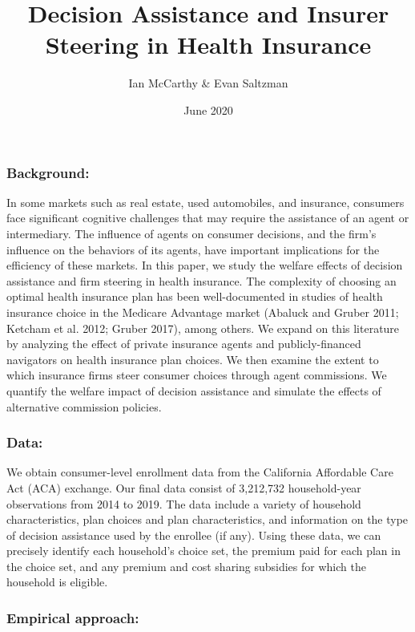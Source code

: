 \documentclass[
  11pt,
]{article}
\title{Decision Assistance and Insurer Steering in Health Insurance}
\author{Ian McCarthy \& Evan Saltzman}
\date{June 2020}
\begin{document}
\maketitle

\hypertarget{background}{%
\subsubsection{Background:}\label{background}}

In some markets such as real estate, used automobiles, and insurance, consumers face significant cognitive challenges that may require the assistance of an agent or intermediary. The influence of agents on consumer decisions, and the firm's influence on the behaviors of its agents, have important implications for the efficiency of these markets. In this paper, we study the welfare effects of decision assistance and firm steering in health insurance. The complexity of choosing an optimal health insurance plan has been well-documented in studies of health insurance choice in the Medicare Advantage market (Abaluck and Gruber 2011; Ketcham et al. 2012; Gruber 2017), among others. We expand on this literature by analyzing the effect of private insurance agents and publicly-financed navigators on health insurance plan choices. We then examine the extent to which insurance firms steer consumer choices through agent commissions. We quantify the welfare impact of decision assistance and simulate the effects of alternative commission policies.

\hypertarget{data}{%
\subsubsection{Data:}\label{data}}

We obtain consumer-level enrollment data from the California Affordable Care Act (ACA) exchange. Our final data consist of 3,212,732 household-year observations from 2014 to 2019. The data include a variety of household characteristics, plan choices and plan characteristics, and information on the type of decision assistance used by the enrollee (if any). Using these data, we can precisely identify each household's choice set, the premium paid for each plan in the choice set, and any premium and cost sharing subsidies for which the household is eligible.

\hypertarget{empirical-approach}{%
\subsubsection{Empirical approach:}\label{empirical-approach}}
\end{document}
